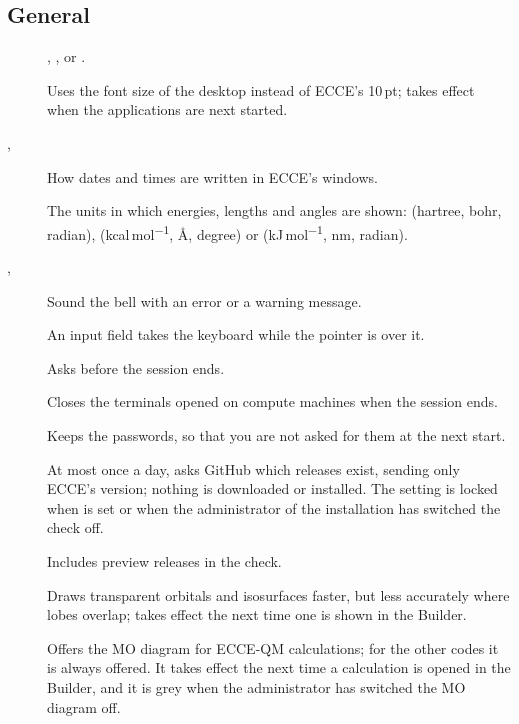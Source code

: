 \subsection*{General}
\begin{description}
	\item[] , ,  or .
	\item[] Uses the font size of the desktop instead of ECCE's 10\,pt; takes effect when the applications are next started.
	\item[, ] How dates and times are written in ECCE's windows.
	\item[] The units in which energies, lengths and angles are shown:  (hartree, bohr, radian),  (kcal\,mol\textsuperscript{$-1$}, \AA, degree) or  (kJ\,mol\textsuperscript{$-1$}, nm, radian).
	\item[, ] Sound the bell with an error or a warning message.
	\item[] An input field takes the keyboard while the pointer is over it.
	\item[] Asks before the session ends.
	\item[] Closes the terminals opened on compute machines when the session ends.
	\item[] Keeps the passwords, so that you are not asked for them at the next start.
	\item[] At most once a day, asks GitHub which releases exist, sending only ECCE's version; nothing is downloaded or installed. The setting is locked when  is set or when the administrator of the installation has switched the check off.
	\item[] Includes preview releases in the check.
	\item[] Draws transparent orbitals and isosurfaces faster, but less accurately where lobes overlap; takes effect the next time one is shown in the Builder.
	\item[] Offers the MO diagram for ECCE-QM calculations; for the other codes it is always offered. It takes effect the next time a calculation is opened in the Builder, and it is grey when the administrator has switched the MO diagram off.
\end{description}

